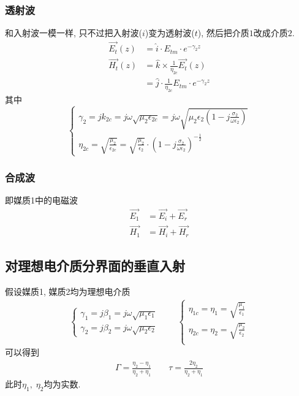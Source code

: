 \documentclass[a4paper]{report}
\begin{document}
\subsubsection{透射波}
和入射波一模一样, 只不过把入射波($i$)变为透射波($t$), 然后把介质$1$改成介质$2$. 
\begin{align*}
    \vec{E _t}(z)&=\hat{i}\cdot E_{tm}\cdot e^{-\gamma_2 z}\\
    \vec{H _t}(z)&=\hat{k}\times \frac{1}{\eta_{2c}}\vec{E_t}(z) \\
    &=\hat{j}\cdot \frac{1}{\eta_{2c}} E_{tm}\cdot e^{-\gamma_2 z}
\end{align*}
其中$$\begin{cases}
    \gamma_2=jk_{2c}=j\omega\sqrt{\mu_2 \epsilon_{2c}}=j\omega\sqrt{\mu_2\epsilon_2(1-j\frac{\sigma_2}{\omega\epsilon_2})}\\
    \eta_{2c}=\sqrt{\frac{\mu_2}{\epsilon_{2c}}}=\sqrt{\frac{\mu_2}{\epsilon_2}}\cdot (1-j\frac{\sigma_2}{\omega\epsilon_2})^{-\frac{1}{2}}
\end{cases}$$

\subsubsection{合成波}
即媒质1中的电磁波
\begin{align*}
    \vec{E_1}&=\vec{E _i}+\vec{E _r}\\  
    \vec{H_1}&=\vec{H _i}+\vec{H _r}
\end{align*}
\subsection{对理想电介质分界面的垂直入射}
假设媒质1, 媒质2均为理想电介质
\begin{align*}
    \begin{cases}
        \gamma_1=j\beta_1=j\omega\sqrt{\mu_1\epsilon_1}\\
        \gamma_2=j\beta_2=j\omega\sqrt{\mu_2\epsilon_2}
    \end{cases}
    \qquad
    \begin{cases}
        \eta_{1c}=\eta_1=\sqrt{\frac{\mu_1}{\epsilon_1}}\\
        \eta_{2c}=\eta_2=\sqrt{\frac{\mu_2}{\epsilon_2}}\\
    \end{cases}
\end{align*}
可以得到
\begin{align*}
    \Gamma=\frac{\eta_2-\eta_1}{\eta_2+\eta_1}\qquad \tau=\frac{2\eta_2}{\eta_2+\eta_1}
\end{align*}
此时$\eta_1,\;\eta_2$均为实数. 
\end{document}
